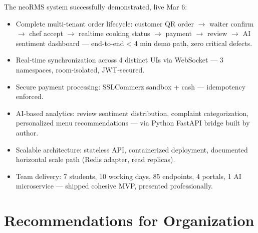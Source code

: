 The neoRMS system successfully demonstrated, live Mar 6:

\begin{itemize}
\item Complete multi-tenant order lifecycle: customer QR order $\rightarrow$ waiter confirm $\rightarrow$ chef accept $\rightarrow$ realtime cooking status $\rightarrow$ payment $\rightarrow$ review $\rightarrow$ AI sentiment dashboard --- end-to-end < 4 min demo path, zero critical defects.
\item Real-time synchronization across 4 distinct UIs via WebSocket --- 3 namespaces, room-isolated, JWT-secured.
\item Secure payment processing: SSLCommerz sandbox + cash --- idempotency enforced.
\item AI-based analytics: review sentiment distribution, complaint categorization, personalized menu recommendations --- via Python FastAPI bridge built by author.
\item Scalable architecture: stateless API, containerized deployment, documented horizontal scale path (Redis adapter, read replicas).
\item Team delivery: 7 students, 10 working days, 85 endpoints, 4 portals, 1 AI microservice --- shipped cohesive MVP, presented professionally.
\end{itemize}

\section{Recommendations for Organization}

